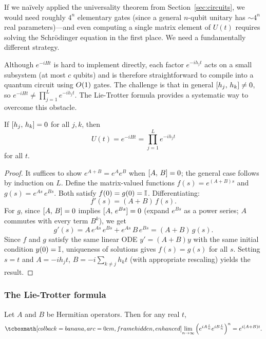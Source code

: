 If we na\"ively applied the universality theorem from Section~\ref{sec:circuits},
we would need roughly $4^n$ elementary gates (since a general $n$-qubit
unitary has $\sim 4^n$ real parameters)---and even computing
a single matrix element of $U(t)$ requires solving the Schrödinger equation
in the first place.  We need a fundamentally different strategy.

\begin{intuition}
  Although $e^{-iHt}$ is hard to implement directly, each factor
  $e^{-ih_j t}$ acts on a small subsystem (at most $c$ qubits) and is
  therefore straightforward to compile into a quantum circuit using $O\!\left(1\right)$
  gates.  The challenge is that in general $[h_j,\,h_k]\neq 0$, so
  $e^{-iHt} \neq \prod_{j=1}^L e^{-ih_j t}$.  The Lie-Trotter formula
  provides a systematic way to overcome this obstacle.
\end{intuition}

\begin{proposition}\label{prop:commuting-case}
  If $[h_j,\,h_k]= 0$ for all $j,k$, then
  \begin{equation}
    U(t) = e^{-iHt} = \prod_{j=1}^L e^{-ih_jt}
  \end{equation}
  for all $t$.
\end{proposition}
\begin{proof}
  It suffices to show $e^{A+B}=e^A e^B$ when $[A,\,B]=0$; the general
  case follows by induction on $L$.  Define the matrix-valued functions
  $f(s) = e^{(A+B)s}$ and $g(s) = e^{As}\,e^{Bs}$.  Both satisfy $f(0)=g(0)=\mathbb{I}$.
  Differentiating:
  \[
    f'(s) = (A+B)\,f(s).
  \]
  For $g$, since $[A,\,B]=0$ implies $[A,\,e^{Bs}]=0$ (expand
  $e^{Bs}$ as a power series; $A$ commutes with every term $B^k$), we get
  \[
    g'(s) = A\,e^{As}\,e^{Bs} + e^{As}\,B\,e^{Bs}
    = (A+B)\,g(s).
  \]
  Since $f$ and $g$ satisfy the same linear ODE $y'=(A+B)y$ with the same
  initial condition $y(0)=\mathbb{I}$, uniqueness of solutions gives $f(s)=g(s)$
  for all $s$.  Setting $s=t$ and $A=-ih_j t$, $B=-i\sum_{k\neq j}h_k t$
  (with appropriate rescaling) yields the result.
\end{proof}

\subsubsection{The Lie-Trotter formula}

\begin{theorem}\label{thm:lie-trotter}
  Let $A$ and $B$ be Hermitian operators.  Then for any real $t$,
  \begin{equation}
    \eqbox{\lim_{n\rightarrow \infty}
    \left(e^{iA\frac{t}{n}}e^{iB\frac{t}{n}}\right)^{n}
    = e^{i(A+B)t}.}
  \end{equation}
\end{theorem}

